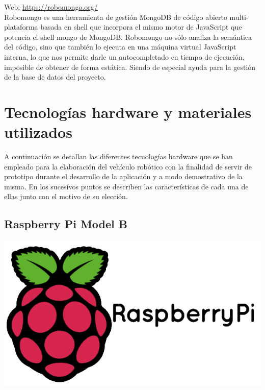 Web: \url{https://robomongo.org/}\\


Robomongo es una herramienta de gestión MongoDB de código abierto multi-plataforma basada en shell que incorpora el mismo motor de JavaScript que potencia el shell mongo de MongoDB.
Robomongo no sólo analiza la semántica del código, sino que también lo ejecuta en una máquina virtual JavaScript interna, lo que nos permite darle un autocompletado en tiempo de ejecución, 
imposible de obtener de forma estática. Siendo de especial ayuda para la gestión de la base de datos del proyecto.\\


\section{Tecnologías hardware y materiales utilizados}
\label{sec:tecnologias-hardware}


A continuación se detallan las diferentes tecnologías hardware que se han
empleado para la elaboración del vehículo robótico con la finalidad de servir de prototipo durante el desarrollo de la aplicación y a modo demostrativo de la misma. En los sucesivos puntos
se describen las características de cada una de ellas junto con el motivo de su elección.


\subsection{Raspberry Pi Model B}
\label{sec:raspberry}



\begin{center}
\includegraphics[scale=0.3]{imagenes/RaspberryPi-logo.png}
\end{center}

